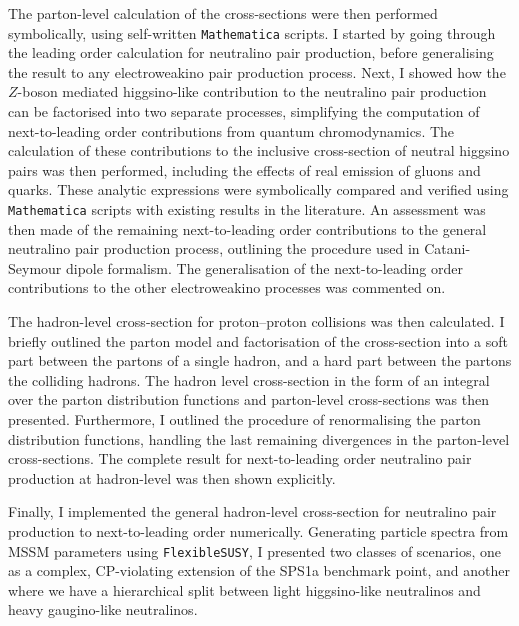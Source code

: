 The parton-level calculation of the cross-sections were then performed symbolically, using self-written \verb|Mathematica| scripts.
I started by going through the leading order calculation for neutralino pair production, before generalising the result to any electroweakino pair production process.
Next, I showed how the \(Z\)-boson mediated higgsino-like contribution to the neutralino pair production can be factorised into two separate processes, simplifying the computation of next-to-leading order contributions from quantum chromodynamics.
The calculation of these contributions to the inclusive cross-section of neutral higgsino pairs was then performed, including the effects of real emission of gluons and quarks.
These analytic expressions were symbolically compared and verified using \verb|Mathematica| scripts with existing results in the literature.
An assessment was then made of the remaining next-to-leading order contributions to the general neutralino pair production process, outlining the procedure used in Catani-Seymour dipole formalism.
The generalisation of the next-to-leading order contributions to the other electroweakino processes was commented on.

The hadron-level cross-section for proton--proton collisions was then calculated.
I briefly outlined the parton model and factorisation of the cross-section into a soft part between the partons of a single hadron, and a hard part between the partons the colliding hadrons.
The hadron level cross-section in the form of an integral over the parton distribution functions and parton-level cross-sections was then presented.
Furthermore, I outlined the procedure of renormalising the parton distribution functions, handling the last remaining divergences in the parton-level cross-sections.
The complete result for next-to-leading order neutralino pair production at hadron-level was then shown explicitly.
\medskip

Finally, I implemented the general hadron-level cross-section for neutralino pair production to next-to-leading order numerically.
Generating particle spectra from MSSM parameters using \verb|FlexibleSUSY|, I presented two classes of scenarios, one as a complex, CP-violating extension of the SPS1a benchmark point, and another where we have a hierarchical split between light higgsino-like neutralinos and heavy gaugino-like neutralinos.

